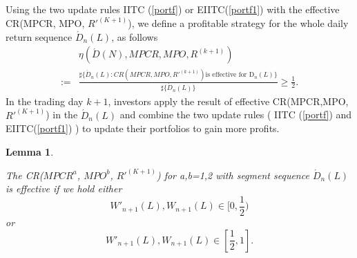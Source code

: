 \documentclass[11pt]{article}
\newtheorem{lemma}{Lemma}[section]
\numberwithin{equation}{section}
\begin{document}
Using the two update rules  IITC (\eqref{portf}) or EIITC(\eqref{portf1}) with the effective CR(MPCR, MPO, $R'^{(K+1)}$), we define a profitable strategy for the whole daily return sequence $ \acute{D}_n(L)$, 
as follows 
\begin{align}\label{cr}
~&\eta (\acute{D}(N),MPCR, MPO,R^{(k+1)})\nonumber\\
:=&\frac{\sharp\{\acute{D}_n(L):CR(MPCR,MPO,R'^{(k+1)}) \text{is effective for \'{D}}_n(L)\}}{\sharp\{\acute{D}_n(L)\}}
\geqslant \frac{1}{2}.
\end{align}
In the trading day $k+1$, investors apply the result of effective  CR(MPCR,MPO,$R'^{(K+1)}$) in the $ \acute{D}_n(L)$ and combine the  two update rules ( IITC (\eqref{portf})  and  EIITC(\eqref{portf1}) ) to update their portfolios to gain more profits.
 
\begin{lemma}\label{eff}
 
The CR($MPCR^{a}$, $MPO^{b}$, $R'^{(K+1)}$) for a,b=1,2 with segment sequence $ \acute{D}_n(L)$ is effective if we  hold 
 either
\begin{equation}\label{cond1}
W'_{n+1}(L), W_{n+1}(L)\in [0,\frac{1}{2})
\end{equation}
or
\begin{equation}\label{cond2}
W'_{n+1}(L), W_{n+1}(L)\in [\frac{1}{2},1]. 
\end{equation}
\end{lemma}
 
\end{document}
